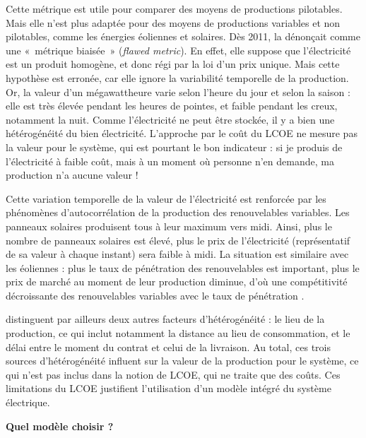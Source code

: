 Cette métrique est utile pour comparer des moyens de productions pilotables. Mais elle n’est plus adaptée pour des moyens de productions variables et non pilotables, comme les énergies éoliennes et solaires. Dès 2011, \citet{Joskow2011a} la dénonçait comme une «~métrique biaisée~» (\textit{flawed metric}). En effet, elle suppose que l’électricité est un produit homogène, et donc régi par la loi d’un prix unique. Mais cette hypothèse est erronée, car elle ignore la variabilité temporelle de la production. Or, la valeur d’un mégawattheure varie selon l’heure du jour et selon la saison : elle est très élevée pendant les heures de pointes, et faible pendant les creux, notamment la nuit. Comme l’électricité ne peut être stockée, il y a bien une hétérogénéité du bien électricité. L’approche par le coût du LCOE ne mesure pas la valeur pour le système, qui est pourtant le bon indicateur : si je produis de l’électricité à faible coût, mais à un moment où personne n’en demande, ma production n’a aucune valeur !

Cette variation temporelle de la valeur de l'électricité est renforcée par les phénomènes d’autocorrélation de la production des renouvelables variables. Les panneaux solaires produisent tous à leur maximum vers midi. Ainsi, plus le nombre de panneaux solaires est élevé, plus le prix de l’électricité (représentatif de sa valeur à chaque instant) sera faible à midi. La situation est similaire avec les éoliennes : plus le taux de pénétration des renouvelables est important, plus le prix de marché au moment de leur production diminue, d’où une compétitivité décroissante des renouvelables variables avec le taux de pénétration \citep{Hirth2013}.

\citet{Hirth2016} distinguent par ailleurs deux autres facteurs d’hétérogénéité : le lieu de la production, ce qui inclut notamment la distance au lieu de consommation, et le délai entre le moment du contrat et celui de la livraison. Au total, ces trois sources d’hétérogénéité influent sur la valeur de la production pour le système, ce qui n’est pas inclus dans la notion de LCOE, qui ne traite que des coûts. 
Ces limitations du LCOE justifient l’utilisation d’un modèle intégré du système électrique.

\vspace{1em}
\textbf{Quel modèle choisir ?}

